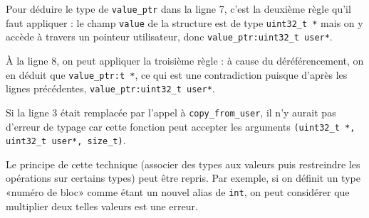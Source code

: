 Pour déduire le type de \texttt{value\_ptr} dans la ligne 7, c'est la
deuxième règle qu'il faut appliquer : le champ \texttt{value} de
la structure est de type \texttt{uint32\_t~*} mais on y accède à travers
un pointeur utilisateur, donc \texttt{value\_ptr:uint32\_t user*}.


À la ligne 8, on peut appliquer la troisième règle : à cause du déréférencement,
on en déduit que \texttt{value\_ptr:t *}, ce qui est une contradiction puisque
d'après les lignes précédentes, \texttt{value\_ptr:uint32\_t user*}.

Si la ligne 3 était remplacée par l'appel à \texttt{copy\_from\_user}, il n'y
aurait pas d'erreur de typage car cette fonction peut accepter les arguments
\texttt{(uint32\_t~*, uint32\_t user*, size\_t)}.

Le principe de cette technique (associer des types aux valeurs puis restreindre
les opérations sur certains types) peut être repris. Par exemple, si on définit
un type «numéro de bloc» comme étant un nouvel alias de \texttt{int}, on peut
considérer que multiplier deux telles valeurs est une erreur.%










